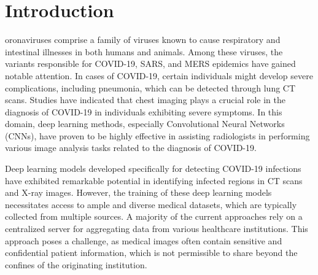 %
\IEEEpeerreviewmaketitle












\section{Introduction}

oronaviruses comprise a family of viruses known to cause respiratory and intestinal illnesses in both humans and animals. Among these viruses, the variants responsible for COVID-19, SARS, and MERS epidemics have gained notable attention. In cases of COVID-19, certain individuals might develop severe complications, including pneumonia, which can be detected through lung CT scans. Studies have indicated that chest imaging plays a crucial role in the diagnosis of COVID-19 in individuals exhibiting severe symptoms. In this domain, deep learning methods, especially Convolutional Neural Networks (CNNs), have proven to be highly effective in assisting radiologists in performing various image analysis tasks related to the diagnosis of COVID-19\cite{kogilavani2022covid}.

Deep learning models developed specifically for detecting COVID-19 infections have exhibited remarkable potential in identifying infected regions in CT scans and X-ray images. However, the training of these deep learning models necessitates access to ample and diverse medical datasets, which are typically collected from multiple sources. A majority of the current approaches rely on a centralized server for aggregating data from various healthcare institutions. This approach poses a challenge, as medical images often contain sensitive and confidential patient information, which is not permissible to share beyond the confines of the originating institution.

